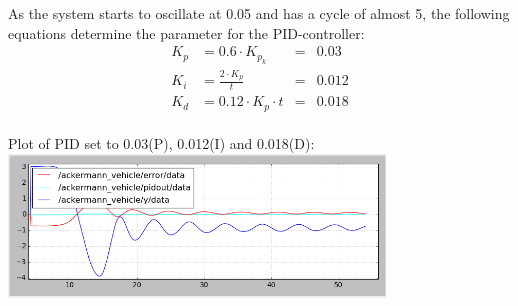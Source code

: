 As the system starts to oscillate at 0.05 and has a cycle of almost 5, the following equations determine the parameter for the PID-controller:\\
\begin{align*}
K_p &=0.6\cdot K_{p_k}      & = & 0.03\\
K_i &=\frac{2\cdot K_p}{t}  & = & 0.012\\
K_d &=0.12\cdot K_p\cdot t  & = & 0.018
\end{align*}\\

Plot of PID set to 0.03(P), 0.012(I) and 0.018(D):\\
\includegraphics[width=0.75\textwidth]{img/screen_ue7_t2_pid.png}
